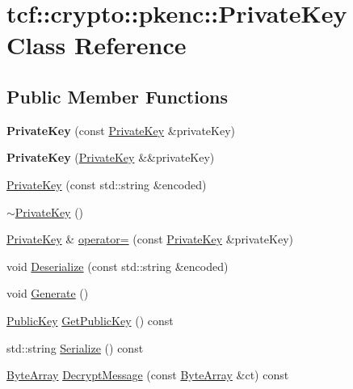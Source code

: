 \hypertarget{classtcf_1_1crypto_1_1pkenc_1_1PrivateKey}{}\section{tcf\+:\+:crypto\+:\+:pkenc\+:\+:Private\+Key Class Reference}
\label{classtcf_1_1crypto_1_1pkenc_1_1PrivateKey}
\subsection*{Public Member Functions}
\begin{DoxyCompactItemize}
\item 
\mbox{\label{classtcf_1_1crypto_1_1pkenc_1_1PrivateKey_afda382deaac827d6e25f92e8362364a6}} 
{\bfseries Private\+Key} (const \hyperlink{classtcf_1_1crypto_1_1pkenc_1_1PrivateKey}{Private\+Key} \&private\+Key)
\item 
\mbox{\label{classtcf_1_1crypto_1_1pkenc_1_1PrivateKey_a5cafe629c341db86bda64d334867a3d4}} 
{\bfseries Private\+Key} (\hyperlink{classtcf_1_1crypto_1_1pkenc_1_1PrivateKey}{Private\+Key} \&\&private\+Key)
\item 
\hyperlink{classtcf_1_1crypto_1_1pkenc_1_1PrivateKey_ad2ab68cb5da100dc1bf973de4b302ef3}{Private\+Key} (const std\+::string \&encoded)
\item 
\hyperlink{classtcf_1_1crypto_1_1pkenc_1_1PrivateKey_a8d981703b97bc83b8b89fb1af226dc51}{$\sim$\+Private\+Key} ()
\item 
\hyperlink{classtcf_1_1crypto_1_1pkenc_1_1PrivateKey}{Private\+Key} \& \hyperlink{classtcf_1_1crypto_1_1pkenc_1_1PrivateKey_a7c2477079f7f65622ddba491a6fa5a32}{operator=} (const \hyperlink{classtcf_1_1crypto_1_1pkenc_1_1PrivateKey}{Private\+Key} \&private\+Key)
\item 
void \hyperlink{classtcf_1_1crypto_1_1pkenc_1_1PrivateKey_ad18262c20398caae0c5243cbddfd0d24}{Deserialize} (const std\+::string \&encoded)
\item 
void \hyperlink{classtcf_1_1crypto_1_1pkenc_1_1PrivateKey_a7b7d056b923d999356da1fee68e7247d}{Generate} ()
\item 
\hyperlink{classtcf_1_1crypto_1_1pkenc_1_1PublicKey}{Public\+Key} \hyperlink{classtcf_1_1crypto_1_1pkenc_1_1PrivateKey_ad15aaa6b8d4e656304502a60526bbfa3}{Get\+Public\+Key} () const
\item 
std\+::string \hyperlink{classtcf_1_1crypto_1_1pkenc_1_1PrivateKey_a56f53348e7b2e88c7c2eb4cc839727b2}{Serialize} () const
\item 
\hyperlink{types_8h_a35da937e2331acce98d47f44892f4a76}{Byte\+Array} \hyperlink{classtcf_1_1crypto_1_1pkenc_1_1PrivateKey_abc60da947e8776a38376ad0a4b2fc391}{Decrypt\+Message} (const \hyperlink{types_8h_a35da937e2331acce98d47f44892f4a76}{Byte\+Array} \&ct) const
\end{DoxyCompactItemize}


